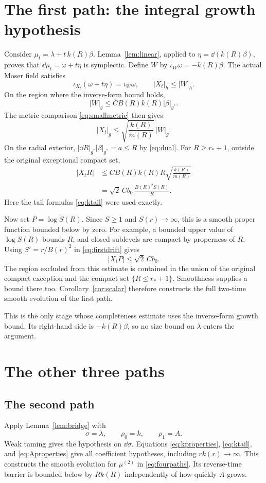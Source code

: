 \section{The first path: the integral growth hypothesis}
Consider $\mu_t=\lambda+t\,k(R)\beta$.
Lemma~\ref{lem:linear}, applied to $\eta=\dd(k(R)\beta)$,
proves that $\dd\mu_t=\omega+t\eta$ is symplectic.
Define $W$ by $\iota_W\omega=-k(R)\beta$.
The actual Moser field satisfies
\[
 \iota_{X_t}(\omega+t\eta)=\iota_W\omega,\qquad |X_t|_h\le|W|_h .
\]
On the region where the inverse-form bound holds,
\[
 |W|_g\le C B(R)k(R)|\beta|_{g^*}.
\]
The metric comparison \eqref{eq:smallmetric} then gives
\[
 |X_t|_g\le\sqrt{\frac{k(R)}{m(R)}}\,|W|_g .
\]
On the radial exterior,
$|\dd R|_{g^*}|\beta|_{g^*}=a\le R$ by \eqref{eq:dual}.
For $R\ge r_*+1$, outside the original exceptional compact set,
\begin{align}
 |X_tR|
 &\le C B(R)k(R)R\sqrt{\frac{k(R)}{m(R)}}\nonumber\\
 &=\sqrt2\,Cb_0\,\frac{B(R)^2S(R)}R .
 \label{eq:firstdrift}
\end{align}
Here the tail formulas \eqref{eq:ktail} were used exactly.

Now set $P=\log S(R)$. Since $S\ge1$ and $S(r)\to\infty$,
this is a smooth proper function bounded below by zero.
For example, a bounded upper value of $\log S(R)$ bounds $R$,
and closed sublevels are compact by properness of $R$.
Using $S'=r/B(r)^2$ in \eqref{eq:firstdrift} gives
\[
 |X_tP|\le\sqrt2\,Cb_0 .
\]
The region excluded from this estimate is contained in the union
of the original compact exception and the compact set
$\{R\le r_*+1\}$. Smoothness supplies a bound there too.
Corollary~\ref{cor:scalar} therefore constructs the full
two-time smooth evolution of the first path.

This is the only stage whose completeness estimate uses the
inverse-form growth bound. Its right-hand side is $-k(R)\beta$,
so no size bound on $\lambda$ enters the argument.

\section{The other three paths}
\subsection{The second path}
Apply Lemma~\ref{lem:bridge} with
\[
 \sigma=\lambda,\qquad \rho_0=k,\qquad \rho_1=A.
\]
Weak taming gives the hypothesis on $\dd\sigma$.
Equations \eqref{eq:kproperties}, \eqref{eq:ktail}, and
\eqref{eq:Aproperties} give all coefficient hypotheses, including
$rk(r)\to\infty$. This constructs the smooth evolution for
$\mu^{(2)}$ in \eqref{eq:fourpaths}. Its reverse-time barrier is
bounded below by $Rk(R)$ independently of how quickly $A$ grows.

